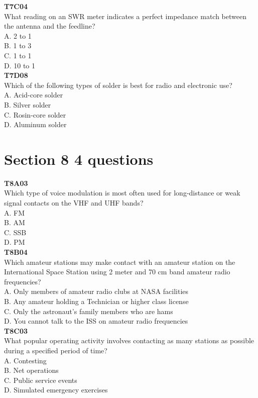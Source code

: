 \documentclass[12pt,letterpaper,twocolumn]{report}
\begin{document}
\textbf{T7C04}\\
What reading on an SWR meter indicates a perfect impedance match between the antenna and the feedline?\\
A. 2 to 1\\
B. 1 to 3\\
C. 1 to 1\\
D. 10 to 1\\

\textbf{T7D08}\\
Which of the following types of solder is best for radio and electronic use?\\
A. Acid-core solder\\
B. Silver solder\\
C. Rosin-core solder\\
D. Aluminum solder\\

\section{Section 8 4 questions}

\textbf{T8A03}\\
Which type of voice modulation is most often used for long-distance or weak signal contacts on the VHF and UHF bands?\\
A. FM\\
B. AM\\
C. SSB\\
D. PM\\

\textbf{T8B04}\\
Which amateur stations may make contact with an amateur station on the International Space Station using 2 meter and 70 cm band amateur radio frequencies?\\
A. Only members of amateur radio clubs at NASA facilities\\
B. Any amateur holding a Technician or higher class license\\
C. Only the astronaut's family members who are hams\\
D. You cannot talk to the ISS on amateur radio frequencies\\

\textbf{T8C03}\\
What popular operating activity involves contacting as many stations as possible during a specified period of time?\\
A. Contesting\\
B. Net operations\\
C. Public service events\\
D. Simulated emergency exercises\\
\end{document}
